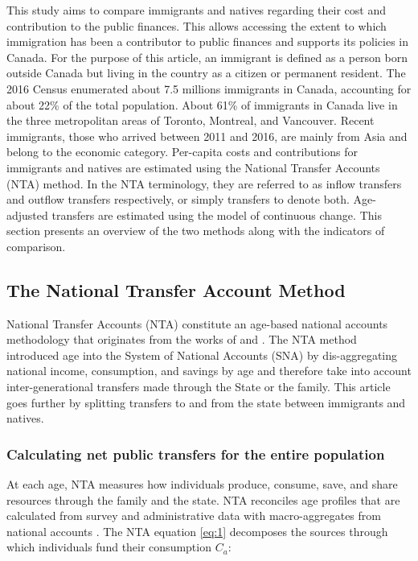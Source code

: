 This study aims to compare immigrants and natives regarding their cost and contribution to the public finances.
This allows accessing the extent to which immigration has been a contributor to public finances and supports its policies in Canada.
For the purpose of this article, an immigrant is defined as a person born outside Canada but living in the country as a citizen or permanent resident.
The 2016 Census enumerated about 7.5 millions immigrants in Canada, accounting for about 22\% of the total population.
About 61\% of immigrants in Canada live in the three metropolitan areas of Toronto, Montreal, and Vancouver.
Recent immigrants, those who arrived between 2011 and 2016, are mainly from Asia and belong to the economic category.
Per-capita costs and contributions for immigrants and natives are estimated using the National Transfer Accounts (NTA) method.
In the NTA terminology, they are referred to as inflow transfers and outflow transfers respectively, or simply transfers to denote both.
Age-adjusted transfers are estimated using the model of continuous change.
This section presents an overview of the two methods along with the indicators of comparison.

\subsection{The National Transfer Account Method}\label{sec:nta}
National Transfer Accounts (NTA) constitute an age-based national accounts methodology that originates from the works of \citep{Lee:1980ci} and \citep{Mason:1988fz}.
The NTA method introduced age into the System of National Accounts (SNA) by dis-aggregating national income, consumption, and savings by age and therefore take into account inter-generational transfers made through the State or the family.
This article goes further by splitting transfers to and from the state between immigrants and natives.

\subsubsection*{Calculating net public transfers for the entire population}
At each age, NTA measures how individuals produce, consume, save, and share resources through the family and the state.
NTA reconciles age profiles that are calculated from survey and administrative data with macro-aggregates from national accounts \citep{UnitedNations:2013vz}.
The NTA equation \eqref{eq:1} decomposes the sources through which individuals fund their consumption \(C_a\):

